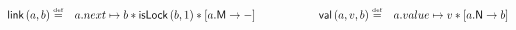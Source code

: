 \begin{figure}
\[\begin{array}{@{} l @{}}
\begin{array}{@{} r l @{\hspace{2cm}} r l @{}}
		\link{a}{b} \eqdef & \cell{a.next}{b} * \isLock{b}{1} * \modC{a}
		& \val{a}{v}{b} \eqdef & \cell{a.value}{v} * \nextC{a}{b}
	\end{array}\\
		
%
	

		


\end{array}\]
\end{figure}
